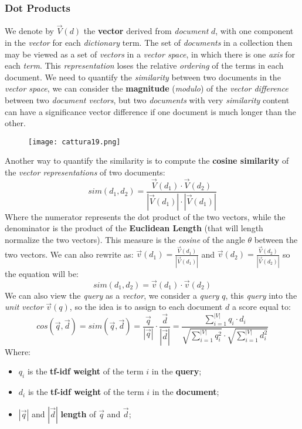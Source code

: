 \documentclass{article}
\begin{document}
\subsubsection{Dot Products}
We denote by $\vec{V}(d)$ the \textbf{vector} derived from \emph{document} $d$, with one component in the \emph{vector} for each \emph{dictionary} term. The set of \emph{documents} in a collection then may be viewed as a set of \emph{vectors} in a \emph{vector space}, in which there is one \emph{axis} for each \emph{term}. This \emph{representation} loses the relative \emph{ordering} of the terms in each document. We need to quantify the \emph{similarity} between two documents in the \emph{vector space}, we can consider the \textbf{magnitude} (\emph{modulo}) of the \emph{vector difference} between two \emph{document vectors}, but two \emph{documents} with very \emph{similarity} content can have a significance vector difference if one document is much longer than the other.
\begin{figure}[H]
  \centering
  \texttt{[image: cattura19.png]}
\end{figure}
Another way to quantify the similarity is to compute the \textbf{cosine similarity} of the \emph{vector representations} of two documents:
\[ sim(d_1, d_2) = \frac{\vec{V}(d_1) \cdot \vec{V}(d_2)}{|\vec{V}(d_1)|\cdot|\vec{V}(d_1)|} \]
Where the numerator represents the dot product of the two vectors, while the denominator is the product of the \textbf{Euclidean Length} (that will length normalize the two vectors). This measure is the \emph{cosine} of the angle $\theta$ between the two vectors. We can also rewrite as: $\vec{v}(d_1) = \frac{\vec{V}(d_1)}{|\vec{V}(d_1)|}$ and  $\vec{v}(d_2) = \frac{\vec{V}(d_2)}{|\vec{V}(d_2)|}$ so the equation will be:
\[ sim(d_1, d_2) = \vec{v}(d_1) \cdot \vec{v}(d_2)\]
We can also view the \emph{query} as a \emph{vector}, we consider a \emph{query} $q$, this \emph{query} into the \emph{unit vector} $\vec{v}(q)$, so the idea is to assign to each document $d$ a score equal to:
\[cos(\vec{q}, \vec{d} ) = sim(\vec{q}, \vec{d} ) = \frac{\vec{q}}{|\vec{q}|} \cdot \frac{\vec{d}}{|\vec{d}|} = \frac{\sum_{i=1}^{|V|} q_i \cdot d_i}{\sqrt{\sum_{i=1}^{|V|} q_i^2 } \cdot \sqrt{\sum_{i=1}^{|V|} d_i^2 }}\]
Where: 
\begin{itemize}
\item $q_i$ is the \textbf{tf-idf weight} of the term $i$ in the \textbf{query};
\item $d_i$ is the \textbf{tf-idf weight} of the term $i$ in the \textbf{document};
\item $|\vec{q}|$ and $|\vec{d}|$ \textbf{length} of $\vec{q}$ and $\vec{d}$;
\end{itemize}
\end{document}
